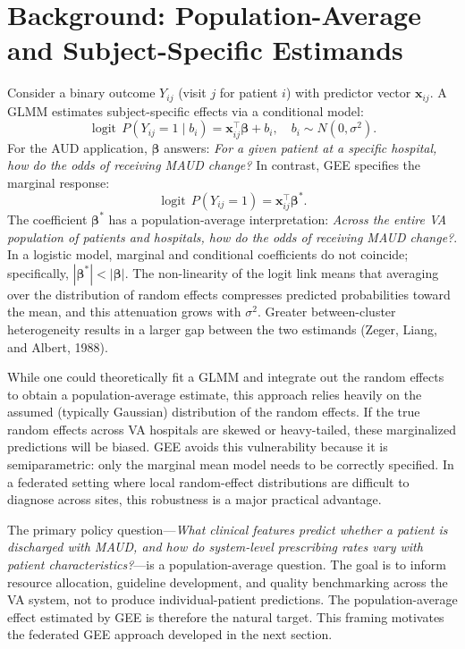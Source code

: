 \documentclass[useAMS,referee]{biom}
\DeclareMathOperator{\logit}{logit}
\begin{document}
\section{Background: Population-Average and Subject-Specific Estimands}
\label{s:estimands}
Consider a binary outcome $Y_{ij}$ (visit $j$ for patient $i$) with predictor vector $\mathbf{x}_{ij}$. A GLMM estimates subject-specific effects via a conditional model:
\begin{equation}
\logit\, P(Y_{ij} = 1 \mid b_i) = \mathbf{x}_{ij}^{\top} \boldsymbol{\beta} + b_i, \quad b_i \sim N(0, \sigma^2).
\label{eq:glmm}
\end{equation}
For the AUD application, $\boldsymbol{\beta}$ answers: \emph{For a given patient at a specific hospital, how do the odds of receiving MAUD change?} In contrast, GEE specifies the marginal response:
\begin{equation}
\logit\, P(Y_{ij} = 1) = \mathbf{x}_{ij}^{\top} \boldsymbol{\beta}^*.
\label{eq:gee}
\end{equation}
The coefficient $\boldsymbol{\beta}^*$ has a population-average interpretation: \emph{Across the entire VA population of patients and hospitals, how do the odds of receiving MAUD change?}. In a logistic model, marginal and conditional coefficients do not coincide; specifically, $|\boldsymbol{\beta}^*| < |\boldsymbol{\beta}|$. The non-linearity of the logit link means that averaging over the distribution of random effects compresses predicted probabilities toward the mean, and this attenuation grows with $\sigma^2$. Greater between-cluster heterogeneity results in a larger gap between the two estimands (Zeger, Liang, and Albert, 1988).

While one could theoretically fit a GLMM and integrate out the random effects to obtain a population-average estimate, this approach relies heavily on the assumed (typically Gaussian) distribution of the random effects. If the true random effects across VA hospitals are skewed or heavy-tailed, these marginalized predictions will be biased. GEE avoids this vulnerability because it is semiparametric: only the marginal mean model needs to be correctly specified. In a federated setting where local random-effect distributions are difficult to diagnose across sites, this robustness is a major practical advantage.

The primary policy question---\emph{What clinical features predict whether a patient is discharged with MAUD, and how do system-level prescribing rates vary with patient characteristics?}---is a population-average question. The goal is to inform resource allocation, guideline development, and quality benchmarking across the VA system, not to produce individual-patient predictions. The population-average effect estimated by GEE is therefore the natural target. This framing motivates the federated GEE approach developed in the next section.
\end{document}
